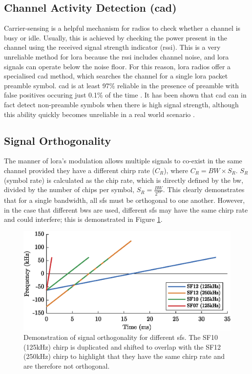 \subsection{Channel Activity Detection (\ac{cad})}\label{sec:cad}
Carrier-sensing is a helpful mechanism for radios to check whether a channel is busy or idle. Usually, this is achieved by checking the power present in the channel using the received signal strength indicator (\ac{rssi}). This is a very unreliable method for \ac{lora} because the \ac{rssi} includes channel noise, and \ac{lora} signals can operate below the noise floor. For this reason, \ac{lora} radios offer a specialised \ac{cad} method, which searches the channel for a single \ac{lora} packet preamble symbol. \ac{cad} is at least 97\% reliable in the presence of preamble with false positives occuring just 0.1\% of the time \cite{3YP:LORA_FOR_IOT}. It has been shown that \ac{cad} can in fact detect non-preamble symbols when there is high signal strength, although this ability quickly becomes unreliable in a real world scenario \cite{Pham:2018:CSMA}.

\subsection{Signal Orthogonality}
The manner of \ac{lora}'s modulation allows multiple signals to co-exist in the same channel provided they have a different chirp rate ($C_R$), where $C_R = BW \times S_R$. $S_R$ (symbol rate) is calculated as the chip rate, which is directly defined by the \ac{bw}, divided by the number of chips per symbol, $S_R=\frac{BW}{2^{SF}}$. This clearly demonstrates that for a single bandwidth, all \ac{sf}s must be orthogonal to one another. However, in the case that different \ac{bw}s are used, different \ac{sf}s may have the same chirp rate and could interfere; this is demonstrated in Figure \ref{fig:orthogonality}.

\begin{figure}[H]
    \centering
   	\includegraphics{Figures/sf_orthogonality_plot.eps}
    \caption[Signal chirp rate orthogonality]{
    Demonstration of signal orthogonality for different \ac{sf}s. The SF10 (125kHz) chirp is duplicated and shifted to overlap with the  SF12 (250kHz) chirp to highlight that they have the same chirp rate and are therefore not orthogonal.
    }
    \label{fig:orthogonality}
\end{figure}

